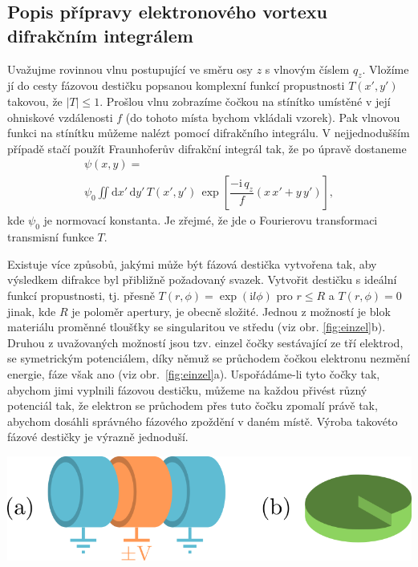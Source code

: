 \documentclass[a4paper,11pt]{article}
\newcommand{\iu}{\mathrm{i}}
\newcommand{\dif}{\mathrm{d}}
\newenvironment{Figure}
{\par\medskip\noindent\minipage{\linewidth}}
{\endminipage\par\medskip}
\begin{document}
\begin{multicols}{2}

\section{Popis přípravy elektronového vortexu difrakčním integrálem}

Uvažujme rovinnou vlnu postupující ve směru osy $z$ s vlnovým číslem $q_z$. Vložíme jí do cesty fázovou destičku popsanou komplexní funkcí propustnosti $T(x',y')$ takovou, že $|T| \leq 1$. Prošlou vlnu zobrazíme čočkou na stínítko umístěné v její ohniskové vzdálenosti $f$ (do tohoto místa bychom vkládali vzorek). Pak vlnovou funkci na stínítku můžeme nalézt pomocí difrakčního integrálu. V nejjednodušším případě stačí použít Fraunhoferův difrakční integrál tak, že po úpravě dostaneme
\begin{multline}
    \psi (x,y) =\\ \psi_0 \iint \dif x' \, \dif y' \, T(x',y') \, \exp \left[ \dfrac{ -\iu \,q_z}{f} (x \, x' + y \, y' ) \right],
\end{multline}
kde $\psi_0$ je normovací konstanta. Je zřejmé, že jde o Fourierovu transformaci transmisní funkce $T$.

Existuje více způsobů, jakými může být fázová destička vytvořena tak, aby výsledkem difrakce byl přibližně požadovaný svazek. Vytvořit destičku s ideální funkcí propustnosti, tj. přesně $T(r,\phi) = \exp (\iu l \phi )$ pro $r \leq R$ a $T(r,\phi)=0$ jinak, kde $R$ je poloměr apertury, je obecně složité. Jednou z možností je blok materiálu proměnné tloušťky se singularitou ve středu (viz obr. \ref{fig:einzel}b). Druhou z uvažovaných možností jsou tzv. einzel čočky sestávající ze tří elektrod, se symetrickým potenciálem, díky němuž se průchodem čočkou elektronu nezmění energie, fáze však ano (viz obr.~\ref{fig:einzel}{a}). Uspořádáme-li tyto čočky tak, abychom jimi vyplnili fázovou destičku, můžeme na každou přivést různý potenciál tak, že elektron se průchodem přes tuto čočku zpomalí právě tak, abychom dosáhli správného fázového zpoždění v daném místě. Výroba takovéto fázové destičky je výrazně jednoduší. 


\begin{Figure}
    \centering
    \includegraphics{einzel_and_ideal.png}
    \label{fig:einzel}
\end{Figure}


\end{multicols}
\end{document}

